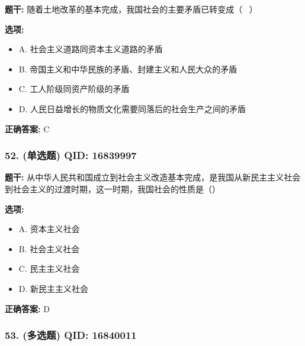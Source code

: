 \documentclass[12pt,UTF8]{ctexart}
\begin{document}
\textbf{题干:}
随着土地改革的基本完成，我国社会的主要矛盾已转变成（  ）

\textbf{选项:}
\begin{itemize}[leftmargin=*]

  \item A. 社会主义道路同资本主义道路的矛盾

  \item B. 帝国主义和中华民族的矛盾、封建主义和人民大众的矛盾

  \item C. 工人阶级同资产阶级的矛盾

  \item D. 人民日益增长的物质文化需要同落后的社会生产之间的矛盾

\end{itemize}

\textbf{正确答案:}
C

\vspace{0.3em}\hrulefill\vspace{0.7em}

\subsubsection*{52. (单选题) \small QID: 16839997}

\textbf{题干:}
从中华人民共和国成立到社会主义改造基本完成，是我国从新民主主义社会到社会主义的过渡时期，这一时期，我国社会的性质是（）

\textbf{选项:}
\begin{itemize}[leftmargin=*]

  \item A. 资本主义社会

  \item B. 社会主义社会

  \item C. 民主主义社会

  \item D. 新民主主义社会

\end{itemize}

\textbf{正确答案:}
D

\vspace{0.3em}\hrulefill\vspace{0.7em}

\subsubsection*{53. (多选题) \small QID: 16840011}
\end{document}
